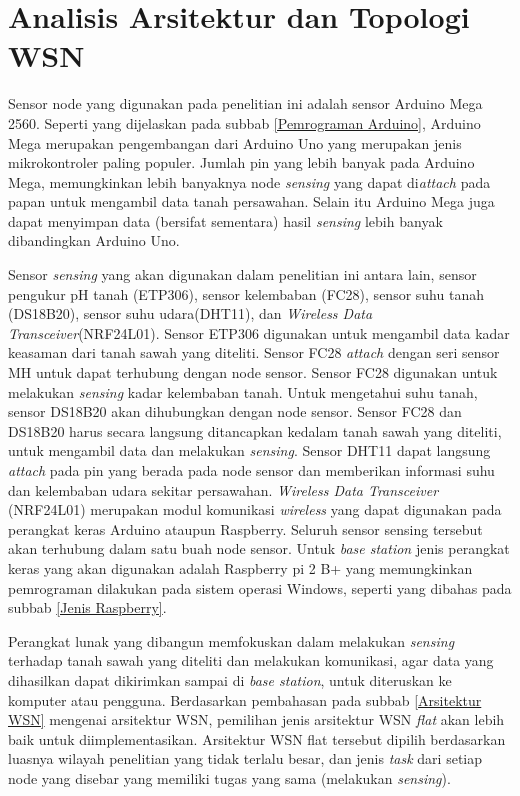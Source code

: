  
  

\section{Analisis Arsitektur dan Topologi WSN}
\label{sec:latex}

    
    Sensor node yang digunakan pada penelitian ini adalah sensor Arduino Mega 2560. Seperti yang dijelaskan pada subbab \ref{Pemrograman Arduino}, Arduino Mega merupakan pengembangan dari Arduino Uno yang merupakan jenis mikrokontroler paling populer. Jumlah pin yang lebih banyak pada Arduino Mega, memungkinkan lebih banyaknya node \textit{sensing} yang dapat di\textit{attach} pada papan untuk mengambil data tanah persawahan. Selain itu Arduino Mega juga dapat menyimpan data (bersifat sementara) hasil \textit{sensing} lebih banyak dibandingkan Arduino Uno.
    
    
    Sensor \textit{sensing} yang akan digunakan dalam penelitian ini antara lain, sensor pengukur pH tanah (ETP306), sensor kelembaban (FC28), sensor suhu tanah (DS18B20), sensor suhu udara(DHT11), dan \textit{Wireless Data Transceiver}(NRF24L01). Sensor ETP306 digunakan untuk mengambil data kadar keasaman dari tanah sawah yang diteliti. Sensor FC28 \textit{attach} dengan seri sensor MH untuk dapat terhubung dengan node sensor. Sensor FC28 digunakan untuk melakukan \textit{sensing} kadar kelembaban tanah. Untuk mengetahui suhu tanah, sensor DS18B20 akan dihubungkan dengan node sensor. Sensor FC28 dan DS18B20 harus secara langsung ditancapkan kedalam tanah sawah yang diteliti, untuk mengambil data dan melakukan \textit{sensing}. Sensor DHT11 dapat langsung \textit{attach} pada pin yang berada pada node sensor dan memberikan informasi suhu dan kelembaban udara sekitar persawahan. \textit{Wireless Data Transceiver} (NRF24L01) merupakan modul komunikasi \textit{wireless} yang dapat digunakan pada perangkat keras Arduino ataupun Raspberry. Seluruh sensor sensing tersebut akan terhubung dalam satu buah node sensor. Untuk \textit{base station} jenis perangkat keras yang akan digunakan adalah Raspberry pi 2 B+ yang memungkinkan pemrograman dilakukan pada sistem operasi Windows, seperti yang dibahas pada subbab \ref{Jenis Raspberry}.
    
     Perangkat lunak yang dibangun memfokuskan dalam melakukan \textit{sensing} terhadap tanah sawah yang diteliti dan melakukan komunikasi, agar data yang dihasilkan dapat dikirimkan sampai di \textit{base station}, untuk diteruskan ke komputer atau pengguna. Berdasarkan pembahasan pada subbab \ref{Arsitektur WSN} mengenai arsitektur WSN, pemilihan jenis arsitektur WSN \textit{flat} akan lebih baik untuk diimplementasikan. Arsitektur WSN flat tersebut dipilih berdasarkan luasnya wilayah penelitian yang tidak terlalu besar, dan jenis \textit{task} dari setiap node yang disebar yang memiliki tugas yang sama (melakukan \textit{sensing}).
     

